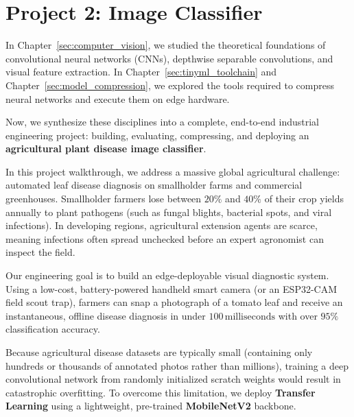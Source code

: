 \section{Project 2: Image Classifier}\label{sec:project2_image}

In Chapter~\ref{sec:computer_vision}, we studied the theoretical foundations of convolutional neural networks (CNNs), depthwise separable convolutions, and visual feature extraction. In Chapter~\ref{sec:tinyml_toolchain} and Chapter~\ref{sec:model_compression}, we explored the tools required to compress neural networks and execute them on edge hardware.

Now, we synthesize these disciplines into a complete, end-to-end industrial engineering project: building, evaluating, compressing, and deploying an \textbf{agricultural plant disease image classifier}.

In this project walkthrough, we address a massive global agricultural challenge: automated leaf disease diagnosis on smallholder farms and commercial greenhouses. Smallholder farmers lose between $20\%$ and $40\%$ of their crop yields annually to plant pathogens (such as fungal blights, bacterial spots, and viral infections). In developing regions, agricultural extension agents are scarce, meaning infections often spread unchecked before an expert agronomist can inspect the field.

Our engineering goal is to build an edge-deployable visual diagnostic system. Using a low-cost, battery-powered handheld smart camera (or an ESP32-CAM field scout trap), farmers can snap a photograph of a tomato leaf and receive an instantaneous, offline disease diagnosis in under $100\,\text{milliseconds}$ with over $95\%$ classification accuracy.

Because agricultural disease datasets are typically small (containing only hundreds or thousands of annotated photos rather than millions), training a deep convolutional network from randomly initialized scratch weights would result in catastrophic overfitting. To overcome this limitation, we deploy \textbf{Transfer Learning} using a lightweight, pre-trained \textbf{MobileNetV2} backbone.

